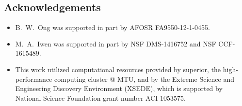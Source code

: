 \documentclass[a0,landscape]{a0poster}
\begin{document}
\begin{multicols}{4}

\section*{Acknowledgements}
\begin{itemize}[noitemsep]
\item B.~W.~Ong was supported in part by AFOSR FA9550-12-1-0455.
\item M.~A.~Iwen was supported in part by NSF DMS-1416752 and NSF
  CCF-1615489.
\item This work utilized computational resources provided by superior,
  the high-performance computing cluster @ MTU, and by the Extreme
  Science and Engineering Discovery Environment (XSEDE), which is
  supported by National Science Foundation grant number ACI-1053575.
\end{itemize}

\vspace*{1in}
\end{multicols}
\end{document}

